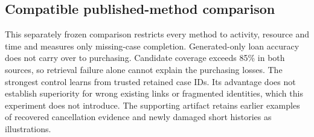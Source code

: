 \subsection{Compatible published-method comparison}

This separately frozen comparison restricts every method to activity, resource and time and measures only missing-case completion. Generated-only loan accuracy does not carry over to purchasing. Candidate coverage exceeds 85\% in both sources, so retrieval failure alone cannot explain the purchasing losses. The strongest control learns from trusted retained case IDs. Its advantage does not establish superiority for wrong existing links or fragmented identities, which this experiment does not introduce. The supporting artifact retains earlier examples of recovered cancellation evidence and newly damaged short histories as illustrations.
